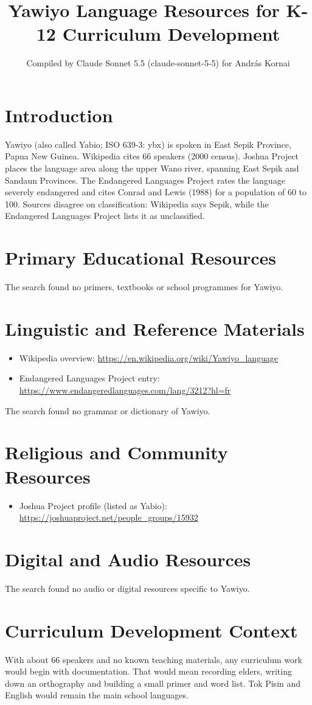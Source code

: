 \documentclass[12pt]{article}
\title{Yawiyo Language Resources for K-12 Curriculum Development}
\author{Compiled by Claude Sonnet 5.5 (claude-sonnet-5-5) for Andr\'as Kornai}
\date{}
\begin{document}
\maketitle

\section{Introduction}
Yawiyo (also called Yabio; ISO 639-3: ybx) is spoken in East Sepik Province, Papua New Guinea. Wikipedia cites 66 speakers (2000 census). Joshua Project places the language area along the upper Wano river, spanning East Sepik and Sandaun Provinces. The Endangered Languages Project rates the language severely endangered and cites Conrad and Lewis (1988) for a population of 60 to 100. Sources disagree on classification: Wikipedia says Sepik, while the Endangered Languages Project lists it as unclassified.

\section{Primary Educational Resources}
The search found no primers, textbooks or school programmes for Yawiyo.

\section{Linguistic and Reference Materials}
\begin{itemize}
\item Wikipedia overview: \url{https://en.wikipedia.org/wiki/Yawiyo_language}
\item Endangered Languages Project entry: \url{https://www.endangeredlanguages.com/lang/3212?hl=fr}
\end{itemize}
The search found no grammar or dictionary of Yawiyo.

\section{Religious and Community Resources}
\begin{itemize}
\item Joshua Project profile (listed as Yabio): \url{https://joshuaproject.net/people_groups/15932}
\end{itemize}

\section{Digital and Audio Resources}
The search found no audio or digital resources specific to Yawiyo.

\section{Curriculum Development Context}
With about 66 speakers and no known teaching materials, any curriculum work would begin with documentation. That would mean recording elders, writing down an orthography and building a small primer and word list. Tok Pisin and English would remain the main school languages.
\end{document}
